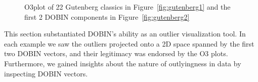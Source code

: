 \documentclass[a4paper,11pt]{article}
\begin{document}
\begin{figure}[!ht]
	\centering
	\caption{O3plot of 22 Gutenberg classics in Figure~\ref{fig:gutenberg1} and the first 2 DOBIN components in Figure~\ref{fig:gutenberg2} }
	\label{fig:gutenberg}
\end{figure}

This section substantiated DOBIN's ability as an outlier visualization tool. In each example we saw the outliers projected onto a 2D space spanned by the first two DOBIN vectors, and their legitimacy was endorsed by the O3 plots. Furthermore, we gained insights about the nature of  outlyingness in data by inspecting  DOBIN vectors. \\
\end{document}
